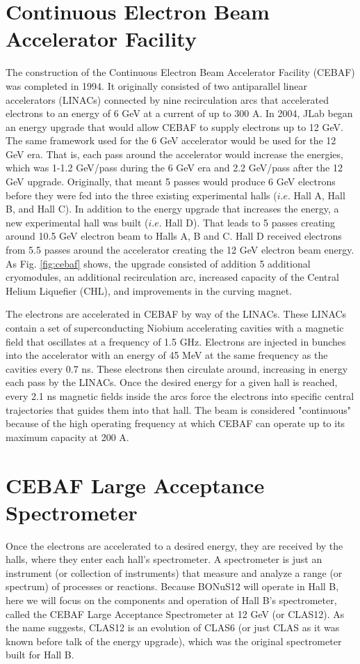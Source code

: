 \section{Continuous Electron Beam Accelerator Facility}
The construction of the Continuous Electron Beam Accelerator Facility (CEBAF) was completed in 1994. It originally consisted of two antiparallel linear accelerators (LINACs) connected by nine recirculation arcs that accelerated electrons to an energy of 6 GeV at a current of up to 300 \textmu A. In 2004, JLab began an energy upgrade that would allow CEBAF to supply electrons up to 12 GeV. The same framework used for the 6 GeV accelerator would be used for the 12 GeV era. That is, each pass around the accelerator would increase the energies, which was 1-1.2 GeV/pass during the 6 GeV era \cite{clasnote:CEBAF} and 2.2 GeV/pass after the 12 GeV upgrade. Originally, that meant 5 passes would produce 6 GeV electrons before they were fed into the three existing experimental halls ($i.e.$ Hall A, Hall B, and Hall C). In addition to the energy upgrade that increases the energy, a new experimental hall was built ($i.e.$ Hall D). That leads to 5 passes creating around 10.5 GeV electron beam to Halls A, B and C. Hall D received electrons from 5.5 passes around the accelerator creating the 12 GeV electron beam energy. As Fig. \ref{fig:cebaf} shows, the upgrade consisted of addition 5 additional cryomodules, an additional recirculation arc, increased capacity of the Central Helium Liquefier (CHL), and improvements in the curving magnet.

The electrons are accelerated in CEBAF by way of the LINACs. These LINACs contain a set of superconducting Niobium accelerating cavities with a magnetic field that oscillates at a frequency of 1.5 GHz. Electrons are injected in bunches into the accelerator with an energy of 45 MeV at the same frequency as the cavities every 0.7 ns. These electrons then circulate around, increasing in energy each pass by the LINACs. Once the desired energy for a given hall is reached, every 2.1 ns magnetic fields inside the arcs force the electrons into specific central trajectories that guides them into that hall. The beam is considered "continuous" because of the high operating frequency at which CEBAF can operate up to its maximum capacity at 200 \textmu A.
 
\section{CEBAF Large Acceptance Spectrometer}
Once the electrons are accelerated to a desired energy, they are received by the halls, where they enter each hall's spectrometer. A spectrometer is just an instrument (or collection of instruments) that measure and analyze a range (or spectrum) of processes or reactions. Because BONuS12 will operate in Hall B, here we will focus on the components and operation of Hall B's spectrometer, called the CEBAF Large Acceptance Spectrometer at 12 GeV (or CLAS12). As the name suggests, CLAS12 is an evolution of CLAS6 (or just CLAS as it was known before talk of the energy upgrade), which was the original spectrometer built for Hall B. 

